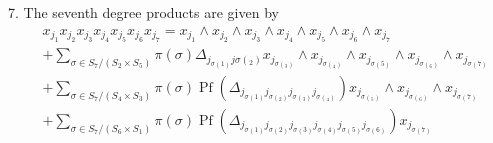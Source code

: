 \documentclass[aps, preprint]{revtex4}
\begin{document}
7. The seventh degree products are given by
\begin{align} & x_{j_{1}} x_{j_{2}} x_{j_{3}} x_{j_{4}} x_{j_{5}} x_{j_{6}} x_{j_{7}} =x_{j_{1}} \wedge x_{j_{2}} \wedge x_{j_{3}} \wedge x_{j_{4}} \wedge x_{j_{5}} \wedge x_{j_{6}} \wedge x_{j_{7}} \nonumber  \\
 &  +\sum _{\sigma  \in S_{7}/\left (S_{2} \times S_{5}\right )}\pi  \left (\sigma \right )  \Delta _{j_{\sigma  \left (1\right )} j \sigma  \left (_{2}\right )}x_{j_{\sigma  \left (_{3}\right )}} \wedge x_{j_{\sigma  \left (_{4}\right )}} \wedge x_{j_{\sigma  \left (5\right )}} \wedge x_{j_{\sigma  \left (_{6}\right )}} \wedge x_{j_{\sigma  \left (7\right )}} \nonumber  \\
 &  +\sum _{\sigma  \in S_{7}/\left (S_{4} \times S_{3}\right )}\pi  \left (\sigma \right ) \ensuremath{\operatorname*{Pf}} \left ( \Delta _{j_{\sigma  \left (1\right )} j_{\sigma  \left (_{2}\right )} j_{\sigma  \left (_{3}\right )} j_{\sigma  \left (_{4}\right )}}\right ) x_{j_{\sigma  \left (_{5}\right )}} \wedge x_{j_{\sigma  \left (_{6}\right )}} \wedge x_{j_{\sigma  \left (7\right )}} \nonumber  \\
 &  +\sum _{\sigma  \in S_{7}/\left (S_{6} \times S_{1}\right )}\pi  \left (\sigma \right ) \ensuremath{\operatorname*{Pf}} \left ( \Delta _{j_{\sigma  \left (1\right )} j_{\sigma  \left (2\right )} j_{\sigma  \left (3\right )} j_{\sigma  \left (4\right )} j_{\sigma  \left (5\right )} j_{\sigma  \left (6\right )}}\right ) x_{j_{\sigma  \left (7\right )}}\end{align}
\end{document}
